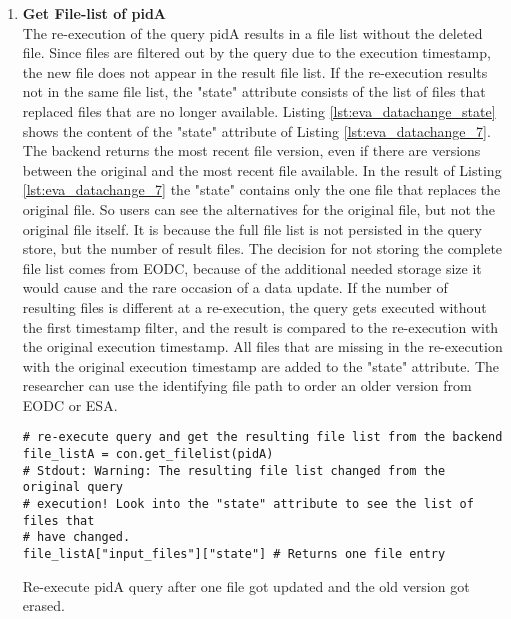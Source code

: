 \documentclass[draft,final]{vutinfth} %
\newenvironment{code}{\captionsetup{type=listing}}{}
\begin{document}
\begin{enumerate}
	\item \textbf{Get File-list of pidA}\\ 
	The re-execution of the query pidA results in a file list without the deleted file. Since files are filtered out by the query due to the execution timestamp, the new file does not appear in the result file list. If the re-execution results not in the same file list, the "state" attribute consists of the list of files that replaced files that are no longer available. Listing \ref{lst:eva_datachange_state} shows the content of the "state" attribute of Listing \ref{lst:eva_datachange_7}. The backend returns the most recent file version, even if there are versions between the original and the most recent file available. In the result of Listing \ref{lst:eva_datachange_7} the "state" contains only the one file that replaces the original file. So users can see the alternatives for the original file, but not the original file itself. It is because the full file list is not persisted in the query store, but the number of result files. The decision for not storing the complete file list comes from EODC, because of the additional needed storage size it would cause and the rare occasion of a data update. If the number of resulting files is different at a re-execution, the query gets executed without the first timestamp filter, and the result is compared to the re-execution with the original execution timestamp. All files that are missing in the re-execution with the original execution timestamp are added to the "state" attribute. The researcher can use the identifying file path to order an older version from EODC or ESA.   
	\begin{code}
		\begin{verbatim}
# re-execute query and get the resulting file list from the backend
file_listA = con.get_filelist(pidA)
# Stdout: Warning: The resulting file list changed from the original query
# execution! Look into the "state" attribute to see the list of files that
# have changed. 
file_listA["input_files"]["state"] # Returns one file entry
		\end{verbatim}
		\caption{Re-execute pidA query after one file got updated and the old version got erased.}
		\label{lst:eva_datachange_7}
	\end{code}	
	
	

\end{enumerate}
\end{document}
